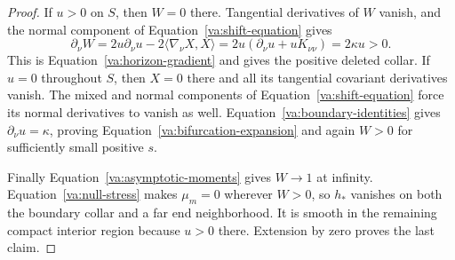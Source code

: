 \begin{proof}
If \(u>0\) on \(S\), then \(W=0\) there.  Tangential derivatives
of \(W\) vanish, and the normal component of
Equation~\eqref{va:shift-equation} gives
\[
 \partial_\nu W
 =2u\partial_\nu u-2\langle\nabla_\nu X,X\rangle
 =2u(\partial_\nu u+uK_{\nu\nu})=2\kappa u>0.
\]
This is Equation~\eqref{va:horizon-gradient} and gives the positive
deleted collar.  If \(u=0\) throughout \(S\), then \(X=0\) there
and all its tangential covariant derivatives vanish.  The mixed and
normal components of Equation~\eqref{va:shift-equation} force its
normal derivatives to vanish as well.  Equation~\eqref{va:boundary-identities}
gives \(\partial_\nu u=\kappa\), proving
Equation~\eqref{va:bifurcation-expansion} and again \(W>0\) for
sufficiently small positive \(s\).

Finally Equation~\eqref{va:asymptotic-moments} gives \(W\to1\) at
infinity.  Equation~\eqref{va:null-stress} makes \(\mu_m=0\) wherever
\(W>0\), so \(h_*\) vanishes on both the boundary collar and a far
end neighborhood.  It is smooth in the remaining compact interior
region because \(u>0\) there.  Extension by zero proves the last claim.
\end{proof}
